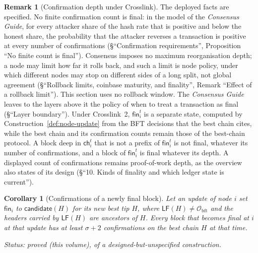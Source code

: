 \documentclass[11pt,a4paper]{article}
\newtheorem{corollary}[theorem]{Corollary}
\theoremstyle{definition}
\newtheorem{remark}[theorem]{Remark}
\newcommand{\bft}{\mathrm{bft}}
\newcommand{\Origin}{\mathcal{O}}
\newcommand{\Obft}{\Origin_{\bft}}
\newcommand{\ch}{\mathsf{ch}}
\newcommand{\LF}{\mathsf{LF}}
\newcommand{\candidate}{\mathsf{candidate}}
\newcommand{\fin}{\mathsf{fin}}
\begin{document}
\begin{remark}[Confirmation depth under Crosslink]\label{rem:not-depth}
The deployed facts are specified. No finite confirmation count is final: in
the model of the \emph{Consensus Guide}, for every attacker share of the hash
rate that is positive and below the honest share, the probability that the
attacker reverses a transaction is positive at every number of confirmations
(\S``Confirmation requirements'', Proposition ``No finite count is final'').
Consensus imposes no maximum reorganisation depth; a node may limit how far
it rolls back, and such a limit is node policy, under which different nodes
may stop on different sides of a long split, not global agreement
(\S``Rollback limits, coinbase maturity, and finality'', Remark ``Effect of a
rollback limit''). This section uses no rollback window. The
\emph{Consensus Guide} leaves to the layers above it the policy of when to
treat a transaction as final (\S``Layer boundary''). Under Crosslink~2,
$\fin_i^t$ is a separate state, computed by Construction~\ref{def:node-update}
from the BFT decisions that the best chain cites, while the best chain and its
confirmation counts remain those of the best-chain protocol. A block deep in
$\ch_i^t$ that is not a prefix of $\fin_i^t$ is not final, whatever its number
of confirmations, and a block of $\fin_i^t$ is final whatever its depth. A
displayed count of confirmations remains proof-of-work depth, as the overview
also states of its design (\S``10. Kinds of finality and which ledger state is
current'').
\end{remark}

\begin{corollary}[Confirmations of a newly final block]%
\label{cor:final-confirmations}
Let an update of node $i$ set $\fin_i$ to $\candidate(H)$ for its new best
tip $H$, where $\LF(H) \neq \Obft$ and the headers carried by $\LF(H)$ are
ancestors of $H$. Every block that becomes final at $i$ at that update has
at least $\sigma + 2$ confirmations on the best chain $H$ at that time.

Status: proved (this volume), of a designed-but-unspecified construction.
\end{corollary}
\end{document}
